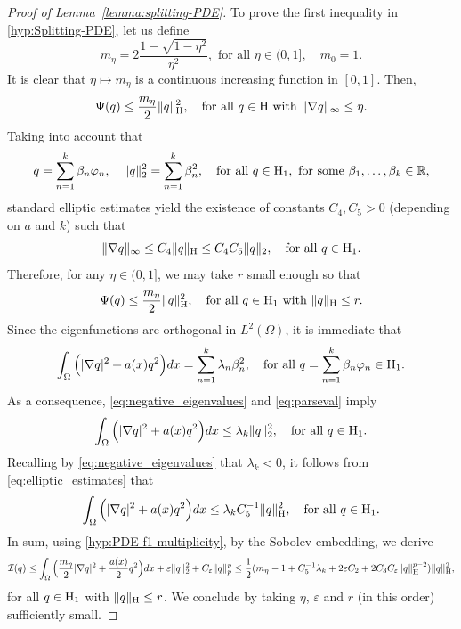 \documentclass{article}
\newcommand{\boI}{\mathcal{I}}
\newcommand{\R}{\mathbb{R}}
\newcommand{\Hilb}{{\textnormal H}}
\theoremstyle{definition}
\begin{document}
\begin{proof}[Proof of Lemma~\ref{lemma:splitting-PDE}]
To prove the first inequality in \eqref{hyp:Splitting-PDE}, let us define 
\[m_\eta =2\frac{1-\sqrt{1-\eta^2}}{\eta^2}, \text{ for all }\eta\in(0,1],\quad m_0=1.\]
It is clear that $\eta\mapsto m_\eta$ is a continuous increasing function in $[0,1]$. Then, 
\begin{equation}
    \Psi(q)\leq \dfrac{m_\eta}{2}\| q\|_\Hilb^2,\quad\hbox{for all }q\in\Hilb\hbox{ with } \|\nabla q\|_\infty\leq \eta.
\end{equation}
Taking into account that
\begin{equation}\label{eq:parseval}
q=\sum_{n=1}^k\beta_n\varphi_n,\quad\|q\|_2^2=\sum_{n=1}^k\beta_n^2,\quad \text{for all }q\in\Hilb_1,\text{ for some }\beta_1,\dots,\beta_k\in\R,
\end{equation}
standard elliptic estimates yield the existence of constants $C_4,C_5>0$ (depending on $a$ and $k$) such that
\begin{equation}\label{eq:elliptic_estimates}
        \|\nabla q\|_\infty\leq C_4\|q\|_\Hilb\leq C_4C_5\|q\|_2,\quad\hbox{for all }q\in\Hilb_1.
\end{equation}
Therefore, for any $\eta\in (0,1]$, we may take $r$ small enough so that
\begin{equation}\label{ineq:Psi-m_eta}
    \Psi(q)\leq \dfrac{m_\eta}{2}\| q\|_\Hilb^2,\quad\hbox{for all }q\in\Hilb_1\hbox{ with } \| q\|_\Hilb\leq r.
\end{equation}
Since the eigenfunctions are orthogonal in $L^2(\Omega)$, it is immediate that
\[\int_\Omega\Big(|\nabla q|^2+a(x)q^2\Big)dx=\sum_{n=1}^k \lambda_n \beta_n^2,\quad\text{for all }q=\sum_{n=1}^k\beta_n\varphi_n\in\Hilb_1.\]
As a consequence, \eqref{eq:negative_eigenvalues} and \eqref{eq:parseval} imply
\[\int_\Omega\Big(|\nabla q|^2+a(x)q^2\Big)dx\leq\lambda_k\|q\|_2^2,\quad\text{for all }q\in\Hilb_1.\]
Recalling by \eqref{eq:negative_eigenvalues} that $\lambda_k<0$, it follows from \eqref{eq:elliptic_estimates} that 
\[\int_\Omega\Big(|\nabla q|^2+a(x)q^2\Big)dx\leq\lambda_kC_5^{-1}\|q\|_\Hilb^2,\quad\text{for all }q\in\Hilb_1.\]
In sum, using \eqref{hyp:PDE-f1-multiplicity}, by the Sobolev embedding, we derive
\begin{align*}
\boI(q)\leq \int_\Omega\Big(\frac{m_\eta}{2}|\nabla q|^2 + \frac{a(x)}{2}q^2\Big)dx+\varepsilon\|q\|_2^2+ C_\varepsilon\|q\|_p^p\leq\frac12(m_\eta-1+C_5^{-1}\lambda_k+2\varepsilon C_2 + 2C_3C_\varepsilon\|q\|_\Hilb^{p-2})\|q\|_\Hilb^2,
\end{align*}
for all $q\in\Hilb_1$ with $\|q\|_\Hilb\leq r$. We conclude by taking $\eta$, $\varepsilon$ and $r$ (in this order) sufficiently small.
\end{proof}
\end{document}
